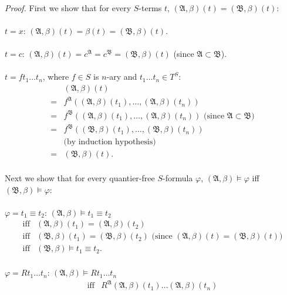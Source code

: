 \begin{enumerate}[1.]
\ 
\\\textit{Proof.} First we show that for every $S$-terms $t$, $( \mathfrak{A}, \beta )(t) = ( \mathfrak{B}, \beta )(t)$:
\ 
\\
\\$t = x$: $( \mathfrak{A}, \beta )(t) = \beta (t) = ( \mathfrak{B}, \beta )(t)$.\\
\ 
\\$t = c$: $( \mathfrak{A}, \beta )(t) = c^{\mathfrak{A}} = c^{\mathfrak{B}} = ( \mathfrak{B}, \beta )(t)$ (since $\mathfrak{A} \subset \mathfrak{B}$).\\
\ 
\\$t = ft_1 \ldots t_n$, where $f \in S$ is $n$-ary and $t_1 \ldots t_n \in T^S$:
\[
\begin{array}{ll}
\,  & ( \mathfrak{A}, \beta )(t) \\
= & f^{\mathfrak{A}} ( ( \mathfrak{A}, \beta )(t_1), \ldots , ( \mathfrak{A}, \beta )(t_n) ) \\
= & f^{\mathfrak{B}} ( ( \mathfrak{A}, \beta )(t_1), \ldots , ( \mathfrak{A}, \beta )(t_n) ) \mbox{ (since $\mathfrak{A} \subset \mathfrak{B}$)} \\
= & f^{\mathfrak{B}} ( ( \mathfrak{B}, \beta )(t_1), \ldots , ( \mathfrak{B}, \beta )(t_n) ) \\
\,  & \mbox{(by induction hypothesis)}\\
= & ( \mathfrak{B}, \beta )(t).
\end{array}
\]
\ 
\\Next we show that for every quantier-free $S$-formula $\varphi$, $( \mathfrak{A}, \beta ) \models \varphi$ iff $( \mathfrak{B}, \beta ) \models \varphi$:\\
\ 
\\$\varphi = t_1 \equiv t_2$: $( \mathfrak{A}, \beta ) \models t_1 \equiv t_2$
\[
\begin{array}{ll}
\mbox{iff} & ( \mathfrak{A}, \beta )(t_1) = ( \mathfrak{A}, \beta )(t_2) \\
\mbox{iff} & ( \mathfrak{B}, \beta )(t_1) = ( \mathfrak{B}, \beta )(t_2) \mbox{ (since $( \mathfrak{A}, \beta )(t) = ( \mathfrak{B}, \beta )(t)$)} \\
\mbox{iff} & ( \mathfrak{B}, \beta ) \models t_1 \equiv t_2 .
\end{array}
\]
\ 
\\$\varphi = Rt_1 \ldots t_n$: $( \mathfrak{A}, \beta ) \models Rt_1 \ldots t_n$
\[
\begin{array}{ll}
\mbox{iff} & R^{\mathfrak{A}} ( \mathfrak{A}, \beta )(t_1) \ldots ( \mathfrak{A}, \beta )(t_n) \\

\end{array}\]
\end{enumerate}
